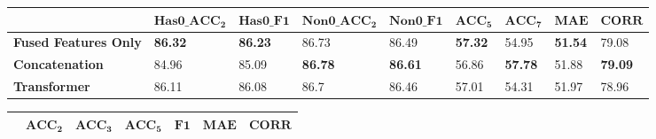 \documentclass[11pt]{article}
\begin{document}
\begin{table*}
\centering
\begin{comment}
\begin{subtable}{\textwidth}
\centering
\begin{tabular}{|l|l|l|l|l|l|l|l|l|}
\hline
 & \textbf{Has0\_acc\_2} & \textbf{Has0\_F1} & \textbf{Non0\_acc\_2} & \textbf{Non0\_F1} & \textbf{acc\_5} & \textbf{acc\_7} & \textbf{MAE} & \textbf{Corr} \\ \hline
\textbf{fused features only} & \textbf{85.91} & \textbf{85.85} & \textbf{88.16} & \textbf{88.15} & 56.08 & 48.25 & 64.29 & \textbf{83.8} \\ \hline
\textbf{concat} & 85.28 & 85.23 & 87.75 & 87.76 & \textbf{57.19} & \textbf{49.18} & 65.81 & 82.88 \\ \hline
\textbf{transformer} & 85.18 & 85.13 & 87.35 & 87.35 & 56.36 & 48.93 & \textbf{64.03} & 83.03 \\ \hline
\end{tabular}
\caption{CMU-MOSI}
\label{tab:CMU-MOSI4}
\end{subtable}
\end{comment}
\begin{subtable}{\textwidth}
\centering
\small
\setlength{\tabcolsep}{3pt}
\renewcommand{\arraystretch}{1.2}
\begin{tabular}{lllllllll}
\hline
 & $\mathbf{Has0\_ACC_2}$ & $\mathbf{Has0\_F1}$ & $\mathbf{Non0\_ACC_2}$ & $\mathbf{Non0\_F1}$ & $\mathbf{ACC_5}$ & $\mathbf{ACC_7}$ & $\mathbf{MAE}$ & $\mathbf{CORR}$ \\ \hline
\textbf{Fused Features Only} & \textbf{86.32} & \textbf{86.23} & 86.73 & 86.49 & \textbf{57.32} & 54.95 & \textbf{51.54} & 79.08 \\ \hline
\textbf{Concatenation} & 84.96 & 85.09 & \textbf{86.78} & \textbf{86.61} & 56.86 & \textbf{57.78} & 51.88 & \textbf{79.09} \\ \hline
\textbf{Transformer} & 86.11 & 86.08 & 86.7 & 86.46 & 57.01 & 54.31 & 51.97 & 78.96 \\ \hline
\end{tabular}
\caption{CMU-MOSEI}
\label{tab:CMU-MOSEI5}
\end{subtable}
\vspace{0.3cm}
\begin{subtable}{\textwidth}
\centering
\small
\setlength{\tabcolsep}{3pt}
\renewcommand{\arraystretch}{1.2}
\begin{tabular}{lllllll}
\hline
 & $\mathbf{ACC_2}$ & $\mathbf{ACC_3}$ & $\mathbf{ACC_5}$ & $\mathbf{F1}$ & $\mathbf{MAE}$ & $\mathbf{CORR}$ \\ \hline

\end{tabular}
\end{subtable}
\end{table*}
\end{document}
